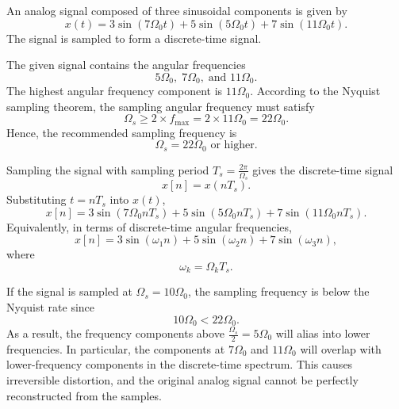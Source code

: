 

An analog signal composed of three sinusoidal components is given by
\[
x(t) = 3\sin(7\Omega_0 t) + 5\sin(5\Omega_0 t) + 7\sin(11\Omega_0 t).
\]
The signal is sampled to form a discrete-time signal.



\begin{solutionblock}
The given signal contains the angular frequencies
\[
5\Omega_0,\; 7\Omega_0,\; \text{and } 11\Omega_0.
\]
The highest angular frequency component is $11\Omega_0$.  
According to the Nyquist sampling theorem, the sampling angular frequency must satisfy
\[
\Omega_s \geq 2 \times f_{\max} = 2 \times 11\Omega_0 = 22\Omega_0.
\]
Hence, the recommended sampling frequency is
\[\Omega_s = 22\Omega_0 \text{ or higher}.\]
\end{solutionblock}

\begin{solutionblock}
Sampling the signal with sampling period $T_s = \frac{2\pi}{\Omega_s}$ gives the discrete-time signal
\[
x[n] = x(nT_s).
\]
Substituting $t = nT_s$ into $x(t)$,
\[
x[n] = 3\sin(7\Omega_0 nT_s) + 5\sin(5\Omega_0 nT_s) + 7\sin(11\Omega_0 nT_s).
\]
Equivalently, in terms of discrete-time angular frequencies,
\[
x[n] = 3\sin(\omega_1 n) + 5\sin(\omega_2 n) + 7\sin(\omega_3 n),
\]
where
\[
\omega_k = \Omega_k T_s.
\]
\end{solutionblock}

\begin{solutionblock}
If the signal is sampled at $\Omega_s = 10\Omega_0$, the sampling frequency is below the Nyquist rate since
\[
10\Omega_0 < 22\Omega_0.
\]
As a result, the frequency components above $\frac{\Omega_s}{2} = 5\Omega_0$ will alias into lower frequencies.
In particular, the components at $7\Omega_0$ and $11\Omega_0$ will overlap with lower-frequency components in the discrete-time spectrum.
This causes irreversible distortion, and the original analog signal cannot be perfectly reconstructed from the samples.

\end{solutionblock}

